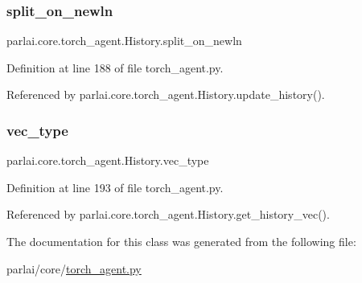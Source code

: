 \subsubsection{\texorpdfstring{split\+\_\+on\+\_\+newln}{split\_on\_newln}}
{\footnotesize\ttfamily parlai.\+core.\+torch\+\_\+agent.\+History.\+split\+\_\+on\+\_\+newln}



Definition at line 188 of file torch\+\_\+agent.\+py.



Referenced by parlai.\+core.\+torch\+\_\+agent.\+History.\+update\+\_\+history().

\mbox{\label{classparlai_1_1core_1_1torch__agent_1_1History_a7e5b6e0372fa48e0e1ba747b5628bfc7}} 
\subsubsection{\texorpdfstring{vec\+\_\+type}{vec\_type}}
{\footnotesize\ttfamily parlai.\+core.\+torch\+\_\+agent.\+History.\+vec\+\_\+type}



Definition at line 193 of file torch\+\_\+agent.\+py.



Referenced by parlai.\+core.\+torch\+\_\+agent.\+History.\+get\+\_\+history\+\_\+vec().



The documentation for this class was generated from the following file\+:\begin{DoxyCompactItemize}
\item 
parlai/core/\hyperlink{torch__agent_8py}{torch\+\_\+agent.\+py}\end{DoxyCompactItemize}
